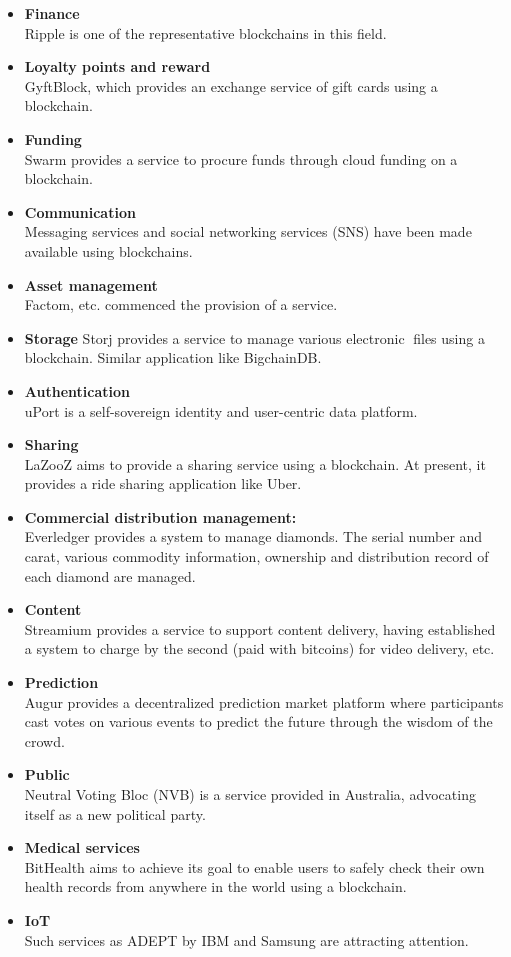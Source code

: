 \begin{itemize}
	\item \textbf{Finance}\\
	Ripple is one of the representative blockchains in this field.
	\item \textbf{Loyalty points and reward}\\
	GyftBlock, which provides an exchange service of gift
	cards using a blockchain.
	\item \textbf{Funding}\\
	Swarm provides a service to procure funds through cloud funding on a
	blockchain.
	\item \textbf{Communication}\\
	Messaging services and social networking services (SNS) have been
	made available using blockchains.
	\item \textbf{Asset management}\\
	Factom, etc. commenced the provision of a service.
	\item \textbf{Storage}
	Storj provides a service to manage various electronic files using a blockchain. Similar application like BigchainDB.
	\item \textbf{Authentication}\\
	uPort is a self-sovereign identity and user-centric data platform. 
	\item \textbf{Sharing}\\
	LaZooZ aims to provide a sharing service using a blockchain. At present, it provides a ride sharing application like Uber.
	\item \textbf{Commercial distribution management:}\\
	Everledger provides a system to manage
	diamonds. The serial number and carat, various commodity information, ownership and distribution record of each diamond are managed.
	\item \textbf{Content}\\
	Streamium provides a service to support content delivery, having established a system to charge by the second (paid with bitcoins) for video delivery, etc.
	\item \textbf{Prediction}\\
	Augur provides a decentralized prediction market platform where participants cast votes on various events to predict the future through the wisdom of the crowd.
	\item \textbf{Public}\\
	Neutral Voting Bloc (NVB) is a service provided in Australia, advocating itself as a new political party.
	\item \textbf{Medical services}\\
		BitHealth aims to achieve its goal to enable users to safely check
	their own health records from anywhere in the world using a blockchain.
	\item \textbf{IoT}\\
	Such services as ADEPT by IBM and Samsung are attracting attention.
	
\end{itemize}

